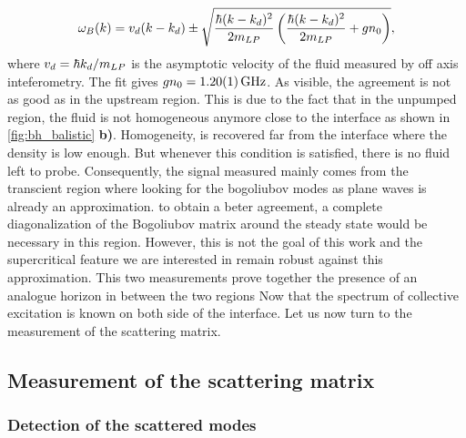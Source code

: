\begin{equation}
    \omega_B(k) = v_d(k-k_d) \pm \sqrt{\dfrac{\hbar (k-k_d)^2}{2m_{LP}} \left({\dfrac{\hbar (k-k_d)^2}{2m_{LP}}} + g n_0 \right)},
\end{equation}
where $v_d = \hbar k_d/m_{LP}$ is the asymptotic velocity of the fluid measured by off axis inteferometry. The fit gives $gn_0=\SI{1.2 \pm 0.01}{\giga \hertz}$. As visible, the agreement is not as good as in the upstream region. 
This is due to the fact that in the unpumped region, the fluid is not homogeneous anymore close to the interface as shown in \autoref{fig:bh_balistic} \textbf{b)}. Homogeneity,
is recovered far from the interface where the density is low enough. But whenever this condition is satisfied, there is no fluid left to probe.  Consequently, the signal measured mainly comes from the transcient region where looking for the bogoliubov modes as plane waves is already an approximation.
to obtain a beter agreement, a complete diagonalization of the Bogoliubov matrix around the steady state would be necessary in this region. However, this is not the goal of this work and the supercritical feature we are interested in
remain robust against this approximation.
This two measurements prove together the presence of an analogue horizon in between the two regions Now that the spectrum of collective excitation is known on both side of the 
interface. Let us now turn to the measurement of the scattering matrix.

\subsection{Measurement of the scattering matrix}
\label{sec:scattering_matrix}

\subsubsection{Detection of the scattered modes}

